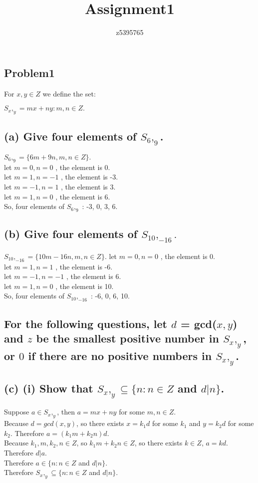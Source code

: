 \documentclass[]{article}
\title{Assignment1}
\author{z5395765}
\begin{document}
\maketitle
\begin{spacing}{1.5}
	

\section*{Problem1}

For $x, y \in Z$ we define the set:
\begin{center}
$ S_{x}, _ {y}  = {mx + ny : m, n \in Z} .$\\
\end{center}
\subsection*{(a) Give four elements of $S_6,_9$.}
$ S_6,_9 = \{ 6m+9n, m,n \in Z \}. $\\
let $ m = 0, n = 0 $ , the element is 0.\\
let $ m = 1, n = -1 $ , the element is -3.\\
let $ m = -1, n = 1 $ , the element is 3.\\
let $ m = 1, n = 0 $ , the element is 6.\\
So, four elements of $ S_6,_9 $ : -3, 0, 3, 6.
\subsection*{(b) Give four elements of $ S_{10},_{-16}. $}
$ S_{10},_{-16} = \{ 10m-16n, m,n \in Z \}. $    
let $ m = 0, n = 0 $ , the element is 0.\\
let $ m = 1, n = 1 $ , the element is -6.\\
let $ m = -1, n = -1 $ , the element is 6.\\
let $ m = 1, n = 0 $ , the element is 10. \\
So, four elements of $ S_{10},_{-16} $ : -6, 0, 6, 10. 
\subsection*{For the following questions, let $ d $ = gcd($ x, y $) and $ z $ be the smallest positive number in $ S_{x}, _ {y} $, or $ 0 $ if there are no positive numbers in $ S_{x}, _ {y} $.}
\subsection*{(c)  (i)  Show that $  S_{x},_{y} \subseteq \{n : n \in Z$ and  $d | n\} $.}
Suppose $ a \in  S_{x},_{y} $, then $ a = mx+ny$ for some $m,n \in Z .$\\
Because $ d = gcd(x,y) $, so there exists $ x = k_1d $ for some $ k_1 $ and $ y = k_2d $ for some $ k_2 $. Therefore $ a = (k_1m + k_2n)d $.\\
Because $ k_1, m, k_2, n \in Z$, so $ k_1m + k_2n  \in Z$, so there exists $ k \in Z $, $ a = kd $. Therefore $ d | a $.\\
Therefore $ a \in \{n : n \in Z$ and  $d | n\} $.\\
Therefore $  S_{x},_{y} \subseteq \{n : n \in Z$ and  $d | n\} $.

\end{spacing}
\end{document}
